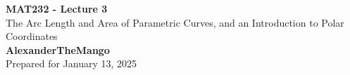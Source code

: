 \begin{titlepage}
    \null %
    \vfill
    \begin{center}
        {\fontsize{40}{48}\selectfont \bfseries MAT232 - Lecture 3}
        \vspace{20pt} \\
        {\LARGE The Arc Length and Area of Parametric Curves, and an Introduction to Polar Coordinates} \\
        \vspace{20pt}
        \textbf{AlexanderTheMango}
        \vspace{8pt}
        \\ Prepared for January 13, 2025
    \end{center}
    \vfill
\end{titlepage}
